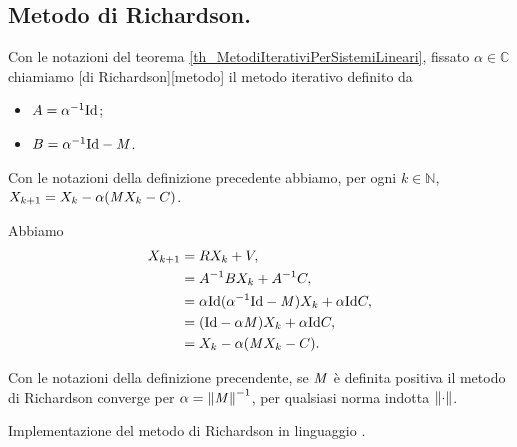 \subsection{Metodo di Richardson.}
\label{MetodiNumericiPerSistemiLineari_MetodoDiRichardson}
\begin{Definition}
  Con le notazioni del teorema \ref{th_MetodiIterativiPerSistemiLineari},
  fissato $\alpha \in \mathbb{C}$
  chiamiamo
  [di Richardson][metodo]
  il metodo iterativo definito da
  \begin{itemize}
    \item $A = \alpha^{-1} \Identity$;
    \item $B = \alpha^{-1} \Identity - \Matrix$.
  \end{itemize}
\end{Definition}
\begin{Theorem}
  Con le notazioni della definizione precedente abbiamo, per ogni $k \in \mathbb{N}$,
  $X_{k + 1} = X_k - \alpha(\mathit{M} X_k - C)$.
\end{Theorem}
\Proof Abbiamo
\begin{align*}
  X_{k + 1}
  &= \IterationMatrix X_k + V,\\
  &= A^{-1} B X_k + A^{-1} C,\\
  &= \alpha \Identity (\alpha^{-1} \Identity - \Matrix) X_k
    + \alpha \Identity C,\\
  &= (\Identity - \alpha \Matrix) X_k + \alpha \Identity C,\\
  &= X_k - \alpha(\Matrix X_k - C).
\end{align*}
\begin{Theorem}
  Con le notazioni della definizione precendente, se $\mathit{M}$ \`e definita
  positiva il metodo di Richardson converge per $\alpha = \Norm{\Matrix}^{-1}$,
  per qualsiasi norma indotta $\Norm{\cdot}$.
\end{Theorem}
\begin{listing}
	\caption{Implementazione del metodo di Richardson in linguaggio .}
\end{listing}
